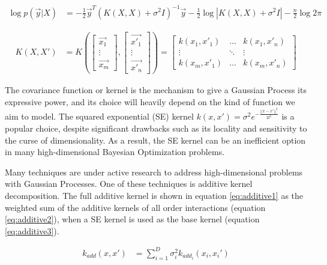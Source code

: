 \documentclass{IOS-Book-Article}
\begin{document}
	\begin{equation} \label{eq:loglikelihood}
		\begin{aligned}
			\log{p(\vec{y}|X)} &= -\frac{1}{2}\vec{y}^T (K(X,X) + \sigma^2 I)^{-1}\vec{y} - \frac{1}{2}\log{|K(X,X) + \sigma^2 I|} - \frac{n}{2}\log{2\pi}
		\end{aligned}
	\end{equation}
	
	\begin{equation}
		\begin{aligned}
			K(X,X') &= K\left(\begin{bmatrix} \vec{x_1} \\ \vdots \\ \vec{x_m} \end{bmatrix}, \begin{bmatrix} \vec{x'_1} \\ \vdots \\ \vec{x'_n} \end{bmatrix}\right) = \begin{bmatrix} 
				k(x_1,x'_1) & \dots  & k(x_1,x'_n)\\
				\vdots & \ddots & \vdots\\
				k(x_m,x'_1) & \dots  & k(x_m,x'_n)
			\end{bmatrix}
		\end{aligned}
	\end{equation}
	
	The covariance function or kernel is the mechanism to give a Gaussian Process its expressive power, and its choice will heavily depend on the kind of function we aim to model\cite{kernel-composition}. The squared exponential (SE) kernel $k(x,x') = \sigma^2 e^{-\frac{||x-x'||^2}{2l^2}}$ is a popular choice, despite significant drawbacks such as its locality and sensitivity to the curse of dimensionality\cite{curse-dimensionality}. As a result, the SE kernel can be an inefficient option in many high-dimensional Bayesian Optimization problems.
	
	Many techniques are under active research to address high-dimensional problems with Gaussian Processes\cite{gp-high-dim}\cite{gp-high-dim2}. One of these techniques is additive kernel decomposition\cite{gp-additive}. The full additive kernel is shown in equation \ref{eq:additive1} as the weighted sum of the additive kernels of all order interactions (equation \ref{eq:additive2}), when a SE kernel is used as the base kernel (equation \ref{eq:additive3}).
	
	\begin{equation} \label{eq:additive1}
		\begin{aligned}
			k_{add}(x,x') &= \sum_{i=1}^D{\sigma_i^2 k_{add_i}(x_i,x_i')}
		\end{aligned}
	\end{equation}
	
\end{document}
